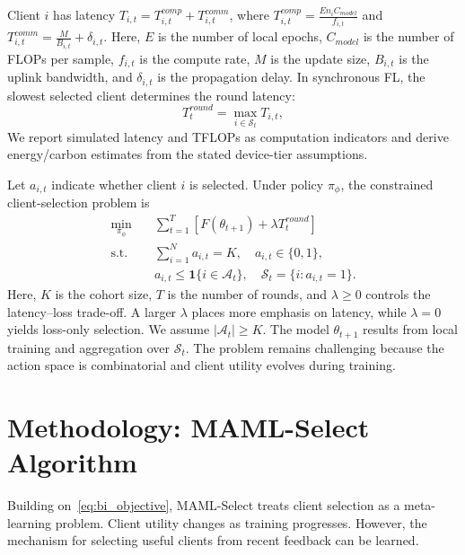 \documentclass[journal]{IEEEtran}
\newcommand{\revision}[1]{#1}
\begin{document}
\revision{Client $i$ has latency $T_{i,t}=T_{i,t}^{comp}+T_{i,t}^{comm}$, where $T_{i,t}^{comp} = \frac{E n_i C_{model}}{f_{i,t}}$ and $T_{i,t}^{comm} = \frac{M}{B_{i,t}} + \delta_{i,t}$. Here, $E$ is the number of local epochs, $C_{model}$ is the number of FLOPs per sample, $f_{i,t}$ is the compute rate, $M$ is the update size, $B_{i,t}$ is the uplink bandwidth, and $\delta_{i,t}$ is the propagation delay. In synchronous FL, the slowest selected client determines the round latency:}
\begin{equation}
	T_t^{round} = \max_{i \in \mathcal{S}_t} T_{i,t},
	\label{eq:round_latency}
\end{equation}
\revision{We report simulated latency and TFLOPs as computation indicators and derive energy/carbon estimates from the stated device-tier assumptions.}

\revision{Let $a_{i,t}$ indicate whether client $i$ is selected. Under policy $\pi_\phi$, the constrained client-selection problem is}
\begin{equation}
	\begin{aligned}
		\min_{\pi_\phi}\quad & \sum_{t=1}^{T} \left[F(\theta_{t+1}) + \lambda T_t^{round}\right] \\
		\text{s.t.}\quad & \sum_{i=1}^{N} a_{i,t}=K,\quad a_{i,t}\in\{0,1\}, \\
		& a_{i,t}\leq \mathbf{1}\{i\in\mathcal{A}_t\},\quad
		\mathcal{S}_t=\{i:a_{i,t}=1\}.
	\end{aligned}
	\label{eq:bi_objective}
\end{equation}
\revision{Here, $K$ is the cohort size, $T$ is the number of rounds, and $\lambda \geq 0$ controls the latency--loss trade-off. A larger $\lambda$ places more emphasis on latency, while $\lambda=0$ yields loss-only selection. We assume $|\mathcal{A}_t|\geq K$. The model $\theta_{t+1}$ results from local training and aggregation over $\mathcal{S}_t$. The problem remains challenging because the action space is combinatorial and client utility evolves during training.}

\section{Methodology: MAML-Select Algorithm}
\revision{Building on~\eqref{eq:bi_objective}, MAML-Select treats client selection as a meta-learning problem. Client utility changes as training progresses. However, the mechanism for selecting useful clients from recent feedback can be learned.}
\end{document}
